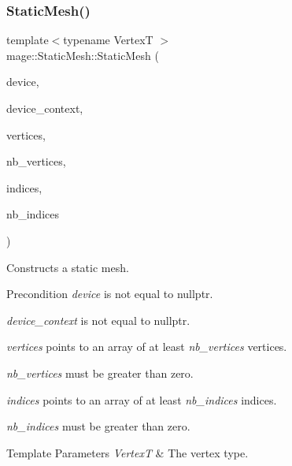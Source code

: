 \subsubsection{\texorpdfstring{Static\+Mesh()}{StaticMesh()}\hspace{0.1cm}{\footnotesize\ttfamily [1/4]}}
{\footnotesize\ttfamily template$<$typename VertexT $>$ \\
mage\+::\+Static\+Mesh\+::\+Static\+Mesh (\begin{DoxyParamCaption}\item[{I\+D3\+D11\+Device2 $\ast$}]{device,  }\item[{I\+D3\+D11\+Device\+Context2 $\ast$}]{device\+\_\+context,  }\item[{const VertexT $\ast$}]{vertices,  }\item[{size\+\_\+t}]{nb\+\_\+vertices,  }\item[{const uint32\+\_\+t $\ast$}]{indices,  }\item[{size\+\_\+t}]{nb\+\_\+indices }\end{DoxyParamCaption})\hspace{0.3cm}{\ttfamily [explicit]}}

Constructs a static mesh.

\begin{DoxyPrecond}{Precondition}
{\itshape device} is not equal to {\ttfamily nullptr}. 

{\itshape device\+\_\+context} is not equal to {\ttfamily nullptr}. 

{\itshape vertices} points to an array of at least {\itshape nb\+\_\+vertices} vertices. 

{\itshape nb\+\_\+vertices} must be greater than zero. 

{\itshape indices} points to an array of at least {\itshape nb\+\_\+indices} indices. 

{\itshape nb\+\_\+indices} must be greater than zero. 
\end{DoxyPrecond}

\begin{DoxyTemplParams}{Template Parameters}
{\em VertexT} & The vertex type. \\
\hline
\end{DoxyTemplParams}


